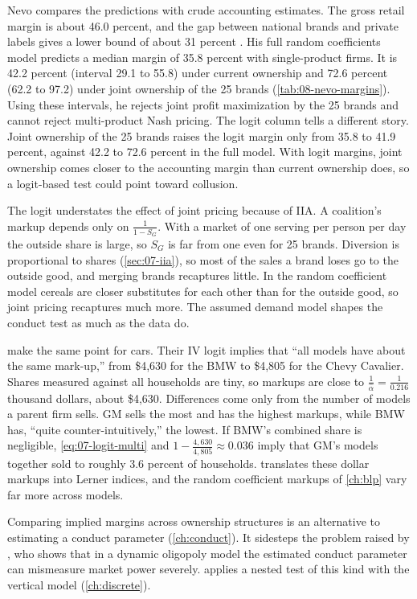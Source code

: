 Nevo compares the predictions with crude accounting estimates. The gross retail margin is about 46.0 percent, and the
gap between national brands and private labels gives a lower bound of about 31 percent \citep[pp.~333--334]{Nevo2001}.
His full random coefficients model predicts a median margin of 35.8 percent with single-product firms. It is 42.2
percent (interval 29.1 to 55.8) under current ownership and 72.6 percent (62.2 to 97.2) under joint ownership of the
25 brands (\cref{tab:08-nevo-margins}). Using these intervals, he rejects joint profit maximization by the 25 brands and
cannot reject multi-product Nash pricing. The logit column tells a different story. Joint ownership of the 25 brands
raises the logit margin only from 35.8 to 41.9 percent, against 42.2 to 72.6 percent in the full model. With logit
margins, joint ownership comes closer to the accounting margin than current ownership does, so a logit-based test
could point toward collusion.

The logit understates the effect of joint pricing because of IIA. A coalition's markup depends only on
$\frac{1}{1 - S_G}$. With a market of one serving per person per day the outside share is large, so $S_G$ is far from
one even for 25 brands. Diversion is proportional to shares (\cref{sec:07-iia}), so most of the sales a brand loses go
to the outside good, and merging brands recaptures little. In the random coefficient model cereals are closer
substitutes for each other than for the outside good, so joint pricing recaptures much more. The assumed demand model
shapes the conduct test as much as the data do.

\citet[p.~874]{BerryLevinsohnPakes1995} make the same point for cars. Their IV logit implies that ``all models have
about the same mark-up,'' from \$4,630 for the BMW to \$4,805 for the Chevy Cavalier. Shares measured against all
households are tiny, so markups are close to $\frac{1}{\hat\alpha} = \frac{1}{0.216}$ thousand dollars, about \$4,630.
Differences come only from the number of models a parent firm sells. GM sells the most and has the highest markups,
while BMW has, ``quite counter-intuitively,'' the lowest. If BMW's combined share is negligible,
\eqref{eq:07-logit-multi} and $1 - \frac{4{,}630}{4{,}805} \approx 0.036$ imply that GM's models together sold to
roughly 3.6 percent of households.  translates these dollar markups into Lerner
indices, and the random coefficient markups of \cref{ch:blp} vary far more across models.

Comparing implied margins across ownership structures is an alternative to estimating a conduct parameter
(\cref{ch:conduct}). It sidesteps the problem raised by \citet[p.~227]{Corts1999}, who shows that in a dynamic
oligopoly model the estimated conduct parameter can mismeasure market power severely. \citet{Bresnahan1987} applies
a nested test of this kind with the vertical model (\cref{ch:discrete}).


